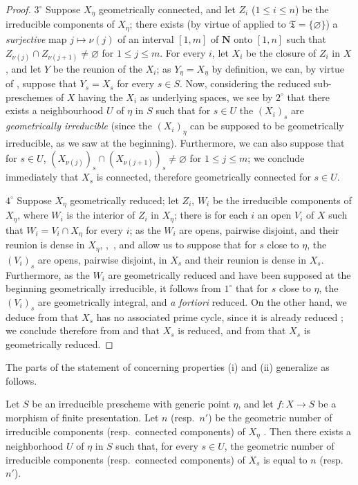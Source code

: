 \begin{proof}
$3^\circ$ Suppose $X_\eta$ geometrically connected, and let $Z_i$ ($1\leqslant i\leqslant n$) be the irreducible components of $X_\eta$; there exists (by virtue of  applied to $\mathfrak{T}=\{\varnothing\}$) a \emph{surjective} map $j\mapsto\nu(j)$ of an interval $[1,m]$ of $\mathbf{N}$ onto $[1,n]$ such that $Z_{\nu(j)}\cap Z_{\nu(j+1)}\neq\varnothing$ for $1\leqslant j\leqslant m$.
For every $i$, let $X_i$ be the closure of $Z_i$ in $X$, and let $Y$ be the reunion of the $X_i$; as $Y_\eta=X_\eta$ by definition, we can, by virtue of , suppose that $Y_s=X_s$ for every $s\in S$.
Now, considering the reduced sub-preschemes of $X$ having the $X_i$ as underlying spaces, we see by $2^\circ$ that there exists a neighbourhood $U$ of $\eta$ in $S$ such that for $s\in U$ the $(X_i)_s$ are \emph{geometrically irreducible} (since the $(X_i)_\eta$ can be supposed to be geometrically irreducible, as we saw at the beginning).
Furthermore, we can also suppose that for $s\in U$, $(X_{\nu(j)})_s\cap(X_{\nu(j+1)})_s\neq\varnothing$  for $1\leqslant j\leqslant m$; we conclude immediately that $X_s$ is connected, therefore  geometrically connected for $s\in U$.

$4^\circ$ Suppose $X_\eta$ geometrically reduced; let $Z_i$, $W_i$ be the irreducible components of $X_\eta$, where $W_i$ is the interior of $Z_i$ in $X_\eta$; there is for each $i$ an open $V_i$ of $X$ such that $W_i=V_i\cap X_\eta$ for every $i$; as the $W_i$ are opens, pairwise disjoint, and their reunion is dense in $X_\eta$, ,~, and  allow us to suppose that for $s$ close to $\eta$, the $(V_i)_s$ are opens, pairwise disjoint, in $X_s$ and their reunion is dense in $X_s$.
Furthermore, as the $W_i$ are geometrically reduced and have been supposed at the beginning geometrically irreducible, it follows from $1^\circ$ that for $s$ close to $\eta$, the $(V_i)_s$ are geometrically integral, and \emph{a fortiori} reduced.
On the other hand, we deduce from  that $X_s$ has no associated prime cycle, since it is already reduced ; we conclude therefore from  and  that $X_s$ is reduced, and from  that $X_s$ is geometrically reduced.
\end{proof}

The parts of the statement of  concerning properties (i) and (ii) generalize as follows.

\begin{proposition}[9.7.8]
\label{IV.9.7.8}
Let $S$ be an irreducible prescheme with generic point $\eta$, and let $f:X\to S$ be a morphism of finite presentation. Let $n$ (resp.\ $n'$) be the geometric number of irreducible components (resp.\ connected components) of $X_\eta$ . Then there exists a neighborhood $U$ of $\eta$ in $S$ such that, for every $s\in U$, the geometric number of irreducible components (resp.\ connected components) of $X_s$ is equal to $n$ (resp.\ $n'$).
\end{proposition}

